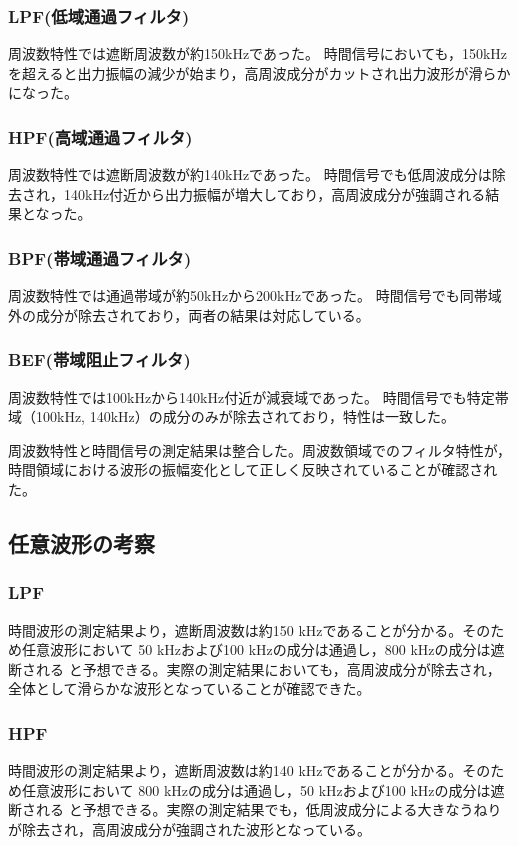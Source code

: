 \documentclass[11pt,dvipdfmx]{jarticle}
\begin{document}
\subsubsection{LPF(低域通過フィルタ)}
周波数特性では遮断周波数が約150kHzであった。
時間信号においても，150kHzを超えると出力振幅の減少が始まり，高周波成分がカットされ出力波形が滑らかになった。
\subsubsection{HPF(高域通過フィルタ)}
周波数特性では遮断周波数が約140kHzであった。
時間信号でも低周波成分は除去され，140kHz付近から出力振幅が増大しており，高周波成分が強調される結果となった。
\subsubsection{BPF(帯域通過フィルタ)}
周波数特性では通過帯域が約50kHzから200kHzであった。
時間信号でも同帯域外の成分が除去されており，両者の結果は対応している。
\subsubsection{BEF(帯域阻止フィルタ)}
周波数特性では100kHzから140kHz付近が減衰域であった。
時間信号でも特定帯域（100kHz, 140kHz）の成分のみが除去されており，特性は一致した。

周波数特性と時間信号の測定結果は整合した。周波数領域でのフィルタ特性が，時間領域における波形の振幅変化として正しく反映されていることが確認された。
\subsection{任意波形の考察}
\subsubsection{LPF}
時間波形の測定結果より，遮断周波数は約150 kHzであることが分かる。そのため任意波形において 50 kHzおよび100 kHzの成分は通過し，800 kHzの成分は遮断される と予想できる。実際の測定結果においても，高周波成分が除去され，全体として滑らかな波形となっていることが確認できた。
\subsubsection{HPF}
時間波形の測定結果より，遮断周波数は約140 kHzであることが分かる。そのため任意波形において 800 kHzの成分は通過し，50 kHzおよび100 kHzの成分は遮断される と予想できる。実際の測定結果でも，低周波成分による大きなうねりが除去され，高周波成分が強調された波形となっている。
\end{document}
